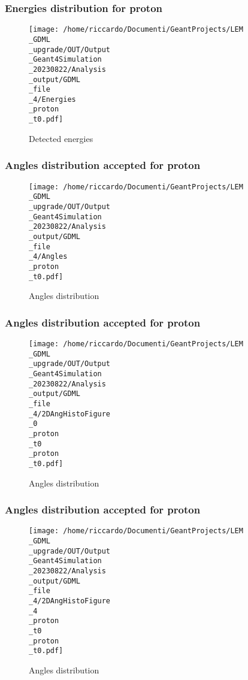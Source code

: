 \documentclass[8pt]{beamer}
\begin{document}
            \begin{frame}
                \frametitle{Energies distribution for proton}
            
        \begin{figure}[h]
            \centering
            \texttt{[image: /home/riccardo/Documenti/GeantProjects/LEM\\\_GDML\\\_upgrade/OUT/Output\\\_Geant4Simulation\\\_20230822/Analysis\\\_output/GDML\\\_file\\\_4/Energies\\\_proton\\\_t0.pdf]}
            \caption{Detected energies}
        \end{figure}
        
            \end{frame}
            
            \begin{frame}
                \frametitle{Angles distribution accepted for proton}
            
        \begin{figure}[h]
            \centering
            \texttt{[image: /home/riccardo/Documenti/GeantProjects/LEM\\\_GDML\\\_upgrade/OUT/Output\\\_Geant4Simulation\\\_20230822/Analysis\\\_output/GDML\\\_file\\\_4/Angles\\\_proton\\\_t0.pdf]}
            \caption{Angles distribution}
        \end{figure}
        
            \end{frame}
            
            \begin{frame}
                \frametitle{Angles distribution accepted for proton}
            
        \begin{figure}[h]
            \centering
            \texttt{[image: /home/riccardo/Documenti/GeantProjects/LEM\\\_GDML\\\_upgrade/OUT/Output\\\_Geant4Simulation\\\_20230822/Analysis\\\_output/GDML\\\_file\\\_4/2DAngHistoFigure\\\_0\\\_proton\\\_t0\\\_proton\\\_t0.pdf]}
            \caption{Angles distribution}
        \end{figure}
        
            \end{frame}
            
            \begin{frame}
                \frametitle{Angles distribution accepted for proton}
            
        \begin{figure}[h]
            \centering
            \texttt{[image: /home/riccardo/Documenti/GeantProjects/LEM\\\_GDML\\\_upgrade/OUT/Output\\\_Geant4Simulation\\\_20230822/Analysis\\\_output/GDML\\\_file\\\_4/2DAngHistoFigure\\\_4\\\_proton\\\_t0\\\_proton\\\_t0.pdf]}
            \caption{Angles distribution}
        \end{figure}
        
            \end{frame}
            
\end{document}
